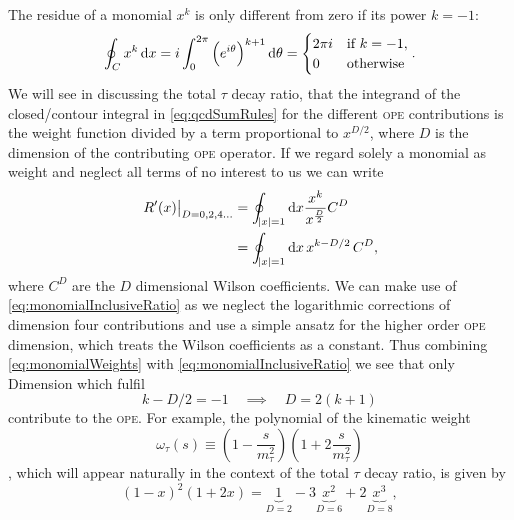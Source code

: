 \documentclass[../../index.tex]{subfiles}
\begin{document}
The residue of a monomial \(x^k\) is only different from zero if its power
\(k=-1\):
\begin{equation}
  \label{eq:monomialWeights}
  \oint_{C} x^k \dif x = i \int_0^{2\pi}\left(e^{i \theta}\right)^{k+1} \dif \theta
  = \begin{cases} \mbox{\(2 \pi i\)} & \mbox{if } k=-1, \\ \mbox{0} & \mbox{otherwise} \end{cases}.
\end{equation}
We will see in discussing the total \(\tau\) decay ratio, that the integrand of
the closed\-/contour integral in \cref{eq:qcdSumRules} for the different
\textsc{ope} contributions is the weight function divided by a term proportional
to \(x^{D/2}\), where \(D\) is the dimension of the contributing \textsc{ope}
operator. If we regard solely a monomial as weight and neglect all terms of no
interest to us we can write
\begin{equation}
  \label{eq:monomialInclusiveRatio}
  \begin{split}
    \left. R^\prime(x) \right\rvert_{D=0,2,4\dots} &= \oint_{\abs{x}=1} \dif x \frac{x^k}{x^{\frac{D}{2}}}C^{D} \\
    &= \oint_{\abs{x}=1} \dif x \,x^{k-D/2} \,C^{D},
  \end{split}
\end{equation}
where \(C^{D}\) are the \(D\) dimensional Wilson coefficients. We can make use
of \cref{eq:monomialInclusiveRatio} as we neglect the logarithmic corrections of
dimension four  contributions and use a simple ansatz for the higher
order \textsc{ope} dimension, which treats the Wilson coefficients as a constant.
Thus combining \cref{eq:monomialWeights} with \cref{eq:monomialInclusiveRatio}
we see that only Dimension which fulfil
\begin{equation}
  k - D/2 = -1 \quad \implies \quad  D = 2(k+1)
\end{equation}
contribute to the \textsc{ope}. For example, the polynomial of the kinematic
weight
\begin{equation}
  \label{eq:kinematicWeight}
  \omega_\tau(s) \equiv \left( 1 - \frac{s}{m_\tau^2} \right) \left( 1 + 2 \frac{s}{m_\tau^2} \right)
\end{equation},
which will appear naturally in the context of the total \(\tau\) decay ratio,
is given by
\begin{equation}
  (1 - x)^2 (1 + 2x) = \underbrace{1}_{D=2} - 3\underbrace{x^2}_{D=6} + 2\underbrace{x^3}_{D=8},
\end{equation}
\end{document}
